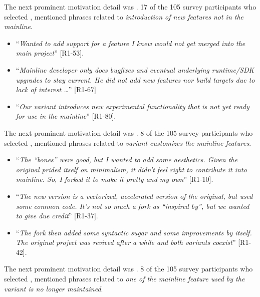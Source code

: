 \nd The next prominent  motivation detail was .
17 of the 105 survey participants who selected , mentioned phrases related to \emph{introduction of new features not in the mainline}.

\begin{itemize}[leftmargin=*]
\item ``\emph{Wanted to add support for a feature I knew would not get merged into the main project}'' [R1-53].
\item ``\emph{Mainline developer only does bugfixes and eventual underlying runtime/SDK upgrades to stay current. He did not add new features nor build targets due to lack of interest \ldots}'' [R1-67]
\item ``\emph{Our variant introduces new experimental functionality that is not yet ready for use in the mainline}'' [R1-80].
\end{itemize}
  
\nd The next prominent  motivation detail was .
8 of the 105 survey participants who selected , mentioned phrases related to \emph{variant customizes the mainline features}.

\begin{itemize}[leftmargin=*]
\item ``\emph{The ``bones'' were good, but I wanted to add some aesthetics. Given the original prided itself on minimalism, it didn't feel right to contribute it into mainline. So, I forked it to make it pretty and my own}'' [R1-10].
\item ``\emph{The new version is a vectorized, accelerated version of the original, but used some common code. It's not so much a fork as ``inspired by'', but we wanted to give due credit}'' [R1-37].
\item ``\emph{The fork then added some syntactic sugar and some improvements by itself. The original project was revived after a while and both variants coexist}'' [R1-42].
\end{itemize}

\nd The next prominent  motivation detail was .
8 of the 105 survey participants who selected , mentioned phrases related to \emph{one of the mainline feature used by the variant is no longer maintained}.

